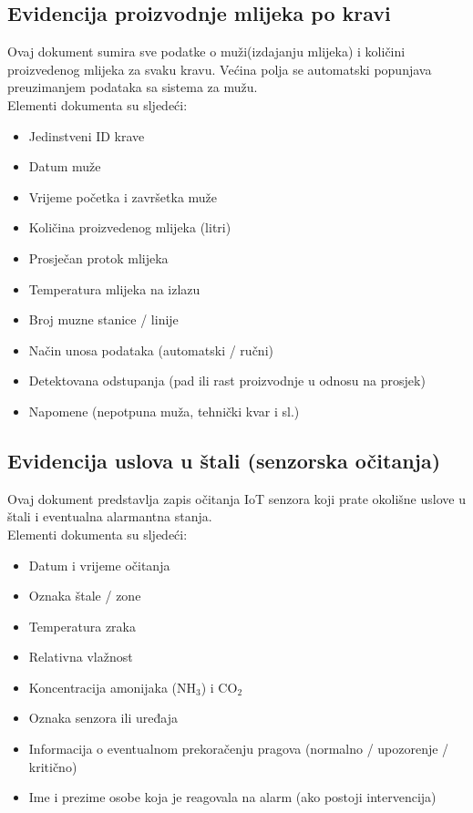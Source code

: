\documentclass{article}
\begin{document}
\subsection*{Evidencija proizvodnje mlijeka po kravi}
Ovaj dokument sumira sve podatke o muži(izdajanju mlijeka) i količini proizvedenog mlijeka za svaku kravu. Većina polja se automatski popunjava preuzimanjem podataka sa sistema za mužu. \\

\noindent Elementi dokumenta su sljedeći:
\begin{itemize}
    \item Jedinstveni ID krave
    \item Datum muže
    \item Vrijeme početka i završetka muže
    \item Količina proizvedenog mlijeka (litri)
    \item Prosječan protok mlijeka
    \item Temperatura mlijeka na izlazu
    \item Broj muzne stanice / linije
    \item Način unosa podataka (automatski / ručni)
    \item Detektovana odstupanja (pad ili rast proizvodnje u odnosu na prosjek)
    \item Napomene (nepotpuna muža, tehnički kvar i sl.)
\end{itemize}

\subsection*{Evidencija uslova u štali (senzorska očitanja)}
Ovaj dokument predstavlja zapis očitanja IoT senzora koji prate okolišne uslove u štali i eventualna alarmantna stanja. \\

\noindent Elementi dokumenta su sljedeći:
\begin{itemize}
    \item Datum i vrijeme očitanja
    \item Oznaka štale / zone
    \item Temperatura zraka
    \item Relativna vlažnost
    \item Koncentracija amonijaka (NH$_3$) i CO$_2$
    \item Oznaka senzora ili uređaja
    \item Informacija o eventualnom prekoračenju pragova (normalno / upozorenje / kritično)
    \item Ime i prezime osobe koja je reagovala na alarm (ako postoji intervencija)
\end{itemize}
\end{document}
